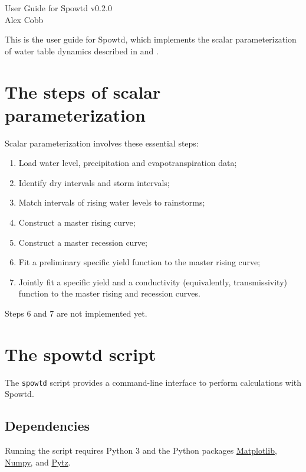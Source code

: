 \documentclass[11pt,a4paper]{article}
\begin{document}
\lstset{language=bash}

{\huge User Guide for Spowtd v0.2.0}\\[2ex]
{\large Alex Cobb}\\[0ex]

\renewcommand{\baselinestretch}{1.18}\normalsize

This is the user guide for Spowtd, which implements the scalar
parameterization of water table dynamics described in
\citet{Cobb_et_al_2017} and \citet{Cobb_and_Harvey_2019}.

\section{The steps of scalar parameterization}
Scalar parameterization involves these essential steps:
\begin{enumerate}
\item Load water level, precipitation and evapotranspiration data;
\item Identify dry intervals and storm intervals;
\item Match intervals of rising water levels to rainstorms;
\item Construct a master rising curve;
\item Construct a master recession curve;
\item Fit a preliminary specific yield function to the master rising
  curve;
\item Jointly fit a specific yield and a conductivity (equivalently,
  transmissivity) function to the master rising and recession curves.
\end{enumerate}

Steps 6 and 7 are not implemented yet.

\section{The spowtd script}
The \texttt{spowtd} script provides a command-line interface to
perform calculations with Spowtd.

\subsection{Dependencies}
Running the script requires Python 3 and the Python packages
\href{https://matplotlib.org/}{Matplotlib},
\href{https://numpy.org/}{Numpy}, and
\href{https://pypi.org/project/pytz/}{Pytz}.
\end{document}
